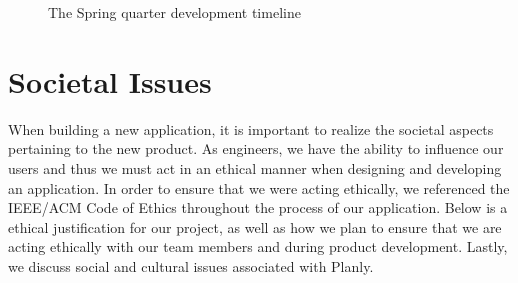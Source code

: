 \begin{figure}[h]
\centering
  \begin{gantt}{17}{10}
    \begin{ganttitle}
    \end{ganttitle}
    \begin{ganttitle}
    \end{ganttitle}

    \end{gantt}
    \caption{The Spring quarter development timeline}
\end{figure}
\FloatBarrier

\section{Societal Issues}
When building a new application, it is important to realize the societal aspects pertaining to the new product. As engineers, we have the ability to influence our users and thus we must act in an ethical manner when designing and developing an application. In order to ensure that we were acting ethically, we referenced the IEEE/ACM Code of Ethics\cite{ethicscode} throughout the process of our application. Below is a ethical justification for our project, as well as how we plan to ensure that we are acting ethically with our team members and during product development. Lastly, we discuss social and cultural issues associated with Planly. 
